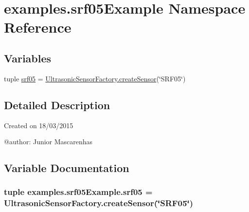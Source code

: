 \hypertarget{namespaceexamples_1_1srf05Example}{}\section{examples.\+srf05\+Example Namespace Reference}
\label{namespaceexamples_1_1srf05Example}
\subsection*{Variables}
\begin{DoxyCompactItemize}
\item 
tuple \hyperlink{namespaceexamples_1_1srf05Example_ac0f70299a8fe79d18932533be7295a16}{srf05} = \hyperlink{classconcretefactory_1_1ultrasonicSensorFactory_1_1UltrasonicSensorFactory_ade21ba1ce348eb9e5cf8eee3fda4a773}{Ultrasonic\+Sensor\+Factory.\+create\+Sensor}(\char`\"{}S\+R\+F05\char`\"{})
\end{DoxyCompactItemize}


\subsection{Detailed Description}
\begin{DoxyVerb}Created on 18/03/2015

@author: Junior Mascarenhas
\end{DoxyVerb}
 

\subsection{Variable Documentation}
\hypertarget{namespaceexamples_1_1srf05Example_ac0f70299a8fe79d18932533be7295a16}{}
\subsubsection[{srf05}]{\setlength{\rightskip}{0pt plus 5cm}tuple examples.\+srf05\+Example.\+srf05 = {\bf Ultrasonic\+Sensor\+Factory.\+create\+Sensor}(\char`\"{}S\+R\+F05\char`\"{})}\label{namespaceexamples_1_1srf05Example_ac0f70299a8fe79d18932533be7295a16}
